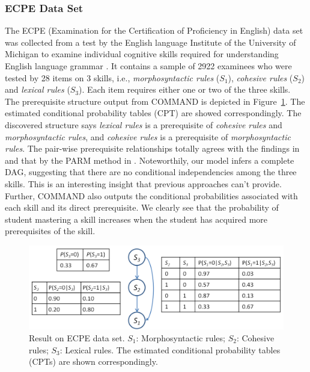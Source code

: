 \documentclass{edm_template}
\begin{document}
	\subsubsection{ECPE Data Set}
	The ECPE (Examination for the Certification of Proficiency in English) data set was collected from a test by the English language Institute
	of the University of Michigan to examine individual cognitive skills required for understanding English language grammar \cite{templin2014hierarchical}.
	It contains a sample of 2922 examinees who were tested by 28 items on 3 skills, i.e., \emph{morphosyntactic rules} ($S_1$), \emph{cohesive rules} ($S_2$) 
	and \emph{lexical rules} ($S_3$). Each item requires either one or two of the three skills. 				
	The prerequisite structure output from COMMAND is depicted in Figure~\ref{fig:ecpe-result}. The estimated conditional probability tables (CPT) are showed correspondingly.
	The discovered structure says \emph{lexical rules} is a prerequisite of \emph{cohesive rules} and \emph{morphosyntactic rules}, 
	and \emph{cohesive rules} is a prerequisite of \emph{morphosyntactic rules}. 
	The pair-wise prerequisite relationships totally agrees with the findings in \cite{templin2014hierarchical} and that by the PARM method in \cite{chen2015discovering}.
	Noteworthily, our model infers a complete DAG, suggesting that there are no conditional independencies among the three skills.
	This is an interesting insight that previous approaches can't provide.   
	Further, COMMAND also outputs the conditional probabilities associated with each skill and its direct prerequisite.
	We clearly see that the probability of student mastering a skill increases when the student has acquired more prerequisites of the skill.
	
				\begin{figure}[!th]
					\begin{center}
						\centering
						\includegraphics[width=0.95\linewidth]{figures/ecpe_results.png}
					\end{center}
					\vspace{-0.5em}
					\caption{Result on ECPE data set. $S_1$: Morphosyntactic rules; $S_2$: Cohesive rules; $S_3$: Lexical rules. 
						The estimated conditional probability tables (CPTs) are shown correspondingly.}
					\label{fig:ecpe-result} 
					\vspace{-1em}
				\end{figure}
\end{document}
